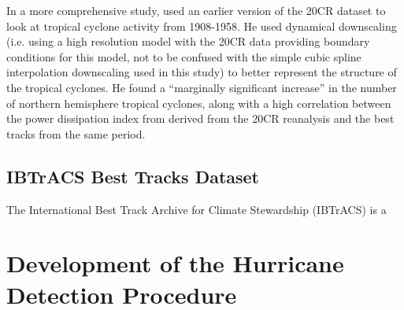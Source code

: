 \documentclass[pdftex,12pt,a4paper]{report}
\begin{document}
In a more comprehensive study, \textcite{emanuel2010} used an earlier version of the 20CR dataset to
look at tropical cyclone activity from 1908-1958. He used dynamical downscaling (i.e. using a
high resolution model with the 20CR data providing boundary conditions for this model, not to be
confused with the simple cubic spline interpolation downscaling used in this study) to better
represent the structure of the tropical cyclones. He found a ``marginally significant increase'' in
the number of northern hemisphere tropical cyclones, along with a high correlation between the power
dissipation index from derived from the 20CR reanalysis and the best tracks from the same period.


\section{IBTrACS Best Tracks Dataset}
\label{sec:ibtracs}
The International Best Track Archive for Climate Stewardship (IBTrACS)
\parencite{knappInternational2010} is a

\chapter{Development of the Hurricane Detection Procedure}
\label{chap:development}

\end{document}

